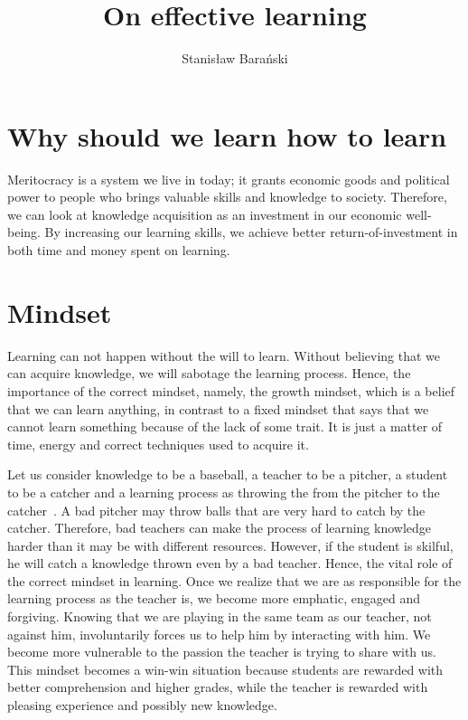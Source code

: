 \documentclass{article}
\title{On effective learning}
\author{Stanisław Barański}
\begin{document}
\maketitle

\section{Why should we learn how to learn}
Meritocracy is a system we live in today; it grants economic goods and political power to people who brings valuable skills and knowledge to society. Therefore, we can look at knowledge acquisition as an investment in our economic well-being. By increasing our learning skills, we achieve better return-of-investment in both time and money spent on learning. 

\section{Mindset}
Learning can not happen without the will to learn. Without believing that we can acquire knowledge, we will sabotage the learning process. Hence, the importance of the correct mindset, namely, the growth mindset, which is a belief that we can learn anything, in contrast to a fixed mindset that says that we cannot learn something because of the lack of some trait. It is just a matter of time, energy and correct techniques used to acquire it. 

Let us consider knowledge to be a baseball, a teacher to be a pitcher, a student to be a catcher and a learning process as throwing the from the pitcher to the catcher~\cite{adler2014read}. A bad pitcher may throw balls that are very hard to catch by the catcher. Therefore, bad teachers can make the process of learning knowledge harder than it may be with different resources. However, if the student is skilful, he will catch a knowledge thrown even by a bad teacher. Hence, the vital role of the correct mindset in learning. Once we realize that we are as responsible for the learning process as the teacher is, we become more emphatic, engaged and forgiving. Knowing that we are playing in the same team as our teacher, not against him, involuntarily forces us to help him by interacting with him. We become more vulnerable to the passion the teacher is trying to share with us. This mindset becomes a win-win situation because students are rewarded with better comprehension and higher grades, while the teacher is rewarded with pleasing experience and possibly new knowledge.
\end{document}
